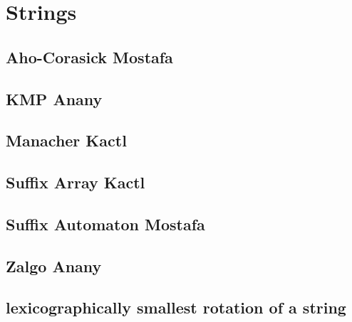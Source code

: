 \section{Strings}
\subsection{Aho-Corasick Mostafa}
\vspace{-2.2ex}
\raggedbottom
\vspace{-3.2ex}
\hrulefill
\subsection{KMP Anany}
\vspace{-2.2ex}
\raggedbottom
\vspace{-3.2ex}
\hrulefill
\subsection{Manacher Kactl}
\vspace{-2.2ex}
\raggedbottom
\vspace{-3.2ex}
\hrulefill
\subsection{Suffix Array Kactl}
\vspace{-2.2ex}
\raggedbottom
\vspace{-3.2ex}
\hrulefill
\subsection{Suffix Automaton Mostafa}
\vspace{-2.2ex}
\raggedbottom
\vspace{-3.2ex}
\hrulefill
\subsection{Zalgo Anany}
\vspace{-2.2ex}
\raggedbottom
\vspace{-3.2ex}
\hrulefill
\subsection{lexicographically smallest rotation of a string}
\vspace{-2.2ex}
\raggedbottom
\vspace{-3.2ex}
\hrulefill

